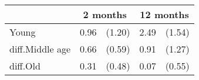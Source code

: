{
\def\sym#1{\ifmmode^{#1}\else\(^{#1}\)\fi}
\begin{tabular*}{.65\hsize}{@{\hskip\tabcolsep\extracolsep\fill}l*{2}{lc}}
\toprule
                &\multicolumn{2}{c}{2 months}&\multicolumn{2}{c}{12 months}\\
\midrule
Young           &     0.96         &   (1.20)&     2.49         &   (1.54)\\
diff.Middle age &     0.66         &   (0.59)&     0.91         &   (1.27)\\
diff.Old        &     0.31         &   (0.48)&     0.07         &   (0.55)\\
\bottomrule
\end{tabular*}
}
